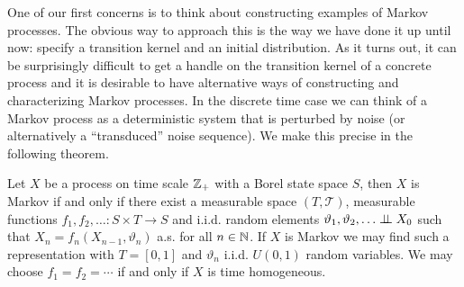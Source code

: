 One of our first concerns is to think about constructing examples of
Markov processes.  The obvious way to approach this is the way we have
done it up until now: specify a transition kernel and an initial
distribution.  As it turns out, it can be surprisingly difficult to
get a handle on the transition kernel of a concrete process and it is
desirable to have alternative ways of constructing and characterizing
Markov processes.  In the discrete time case we can think of a Markov
process as a deterministic system that is perturbed by noise (or
alternatively a  ``transduced'' noise sequence).  We make this precise
in the following theorem.
\begin{thm}\label{RandomMappingRepresentationExistence}Let $X$ be a
  process on time scale $\mathbb{Z}_+$ with a Borel state space
  $S$, then $X$ is Markov if and only if there exist a measurable
  space $(T, \mathcal{T})$, measurable
  functions $f_1, f_2, \dotsc : S \times T \to S$ and
  i.i.d. random elements $\vartheta_1, \vartheta_2, \dotsc
  \perp \! \! \! \perp X_0$ such that $X_n = f_n(X_{n-1}, \vartheta_n)$
  a.s. for all $n \in \mathbb{N}$.   If $X$ is Markov we may find such
  a representation with $T=[0,1]$ and $\vartheta_n$ i.i.d. $U(0,1)$
  random variables.  We may choose $f_1 = f_2 = \dotsb$
  if and only if $X$ is time homogeneous. 
\end{thm}
